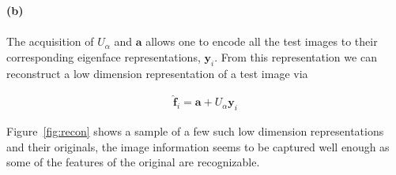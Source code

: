 \begin{homeworkProblem}
  \textbf{(b)}
  \\
  \\

  The acquisition of $U_\alpha$ and $\mathbf{a}$ allows one to encode all the
  test images to their corresponding eigenface representations, $\mathbf{y}_i$.
  From this representation we can reconstruct a low dimension representation of
  a test image via

  \begin{align*}
    \mathbf{\hat{f}}_i = \mathbf{a} + U_\alpha \mathbf{y}_i
  \end{align*}

  \pagebreak

  Figure~\ref{fig:recon} shows a sample of a few such low dimension representations and their
  originals, the image information seems to be
  captured well enough as some of the features of the original are recognizable.


\end{homeworkProblem}
